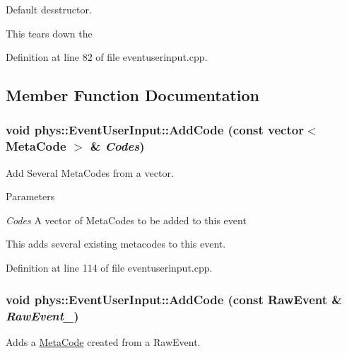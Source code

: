 Default desstructor. 

This tears down the 

Definition at line 82 of file eventuserinput.cpp.



\subsection{Member Function Documentation}
\hypertarget{classphys_1_1EventUserInput_a6b6071496574fbb719ba4a5d97e74b52}{
\subsubsection[{AddCode}]{\setlength{\rightskip}{0pt plus 5cm}void phys::EventUserInput::AddCode (const vector$<$ {\bf MetaCode} $>$ \& {\em Codes})}}
\label{d7/df5/classphys_1_1EventUserInput_a6b6071496574fbb719ba4a5d97e74b52}


Add Several MetaCodes from a vector. 


\begin{DoxyParams}{Parameters}
\item[{\em Codes}]A vector of MetaCodes to be added to this event\end{DoxyParams}
This adds several existing metacodes to this event. 

Definition at line 114 of file eventuserinput.cpp.

\hypertarget{classphys_1_1EventUserInput_a9b0787db5ed6e326c4932fd83798e118}{
\subsubsection[{AddCode}]{\setlength{\rightskip}{0pt plus 5cm}void phys::EventUserInput::AddCode (const {\bf RawEvent} \& {\em RawEvent\_\-})}}
\label{d7/df5/classphys_1_1EventUserInput_a9b0787db5ed6e326c4932fd83798e118}


Adds a \hyperlink{classphys_1_1MetaCode}{MetaCode} created from a RawEvent. 


